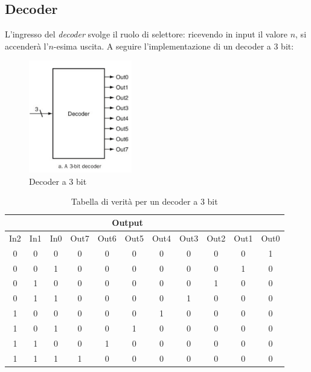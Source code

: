 \documentclass[class=book, crop=false]{standalone}
\begin{document}
\subsection{Decoder}
L'ingresso del \emph{decoder} svolge il ruolo di selettore: ricevendo in input il valore \(n\), si accenderà l'\(n\)-esima uscita. A seguire l'implementazione di un decoder a 3 bit:
\begin{figure}[H]
	\centering
	\includegraphics[width=0.4\textwidth,keepaspectratio]{3bit_decoder.png}
	\caption{Decoder a 3 bit}
\end{figure}
\begin{table}[!h]
	\centering
	\begin{tabular}{|c|c|c|c|c|c|c|c|c|c|c|}
		\hline
		\rowcolor[HTML]{EFEFEF}
		\multicolumn{3}{|c|}{\cellcolor[HTML]{EFEFEF}Input} & \multicolumn{8}{c|}{\cellcolor[HTML]{EFEFEF}Output} \\ \hline
		\rowcolor[HTML]{EFEFEF}
		In2 & In1 & In0 & Out7 & Out6 & Out5 & Out4 & Out3 & Out2 & Out1 & Out0 \\ \hline
		0 & 0 & 0 & 0 & 0 & 0 & 0 & 0 & 0 & 0 & 1 \\ \hline
		0 & 0 & 1 & 0 & 0 & 0 & 0 & 0 & 0 & 1 & 0 \\ \hline
		0 & 1 & 0 & 0 & 0 & 0 & 0 & 0 & 1 & 0 & 0 \\ \hline
		0 & 1 & 1 & 0 & 0 & 0 & 0 & 1 & 0 & 0 & 0 \\ \hline
		1 & 0 & 0 & 0 & 0 & 0 & 1 & 0 & 0 & 0 & 0 \\ \hline
		1 & 0 & 1 & 0 & 0 & 1 & 0 & 0 & 0 & 0 & 0 \\ \hline
		1 & 1 & 0 & 0 & 1 & 0 & 0 & 0 & 0 & 0 & 0 \\ \hline
		1 & 1 & 1 & 1 & 0 & 0 & 0 & 0 & 0 & 0 & 0 \\ \hline
	\end{tabular}
	\caption{Tabella di verità per un decoder a 3 bit}
	\label{decoder-3bit}
\end{table}
\end{document}
